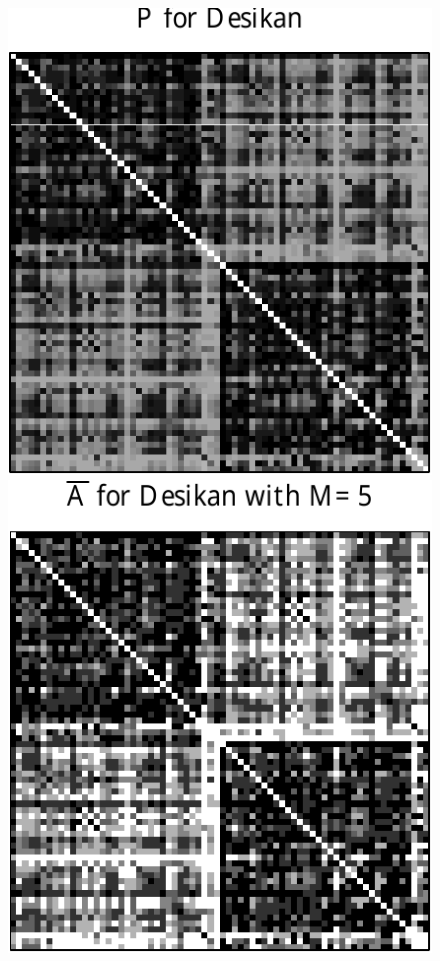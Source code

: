 \documentclass[10pt,letterpaper]{article}
\begin{document}
\begin{figure}[!htbp]
\centering
\includegraphics[height=.18\textheight]{P_desikan.pdf} 
\includegraphics[height=.182\textheight]{Abar_desikan_m5.pdf} 

\end{figure}
\end{document}
